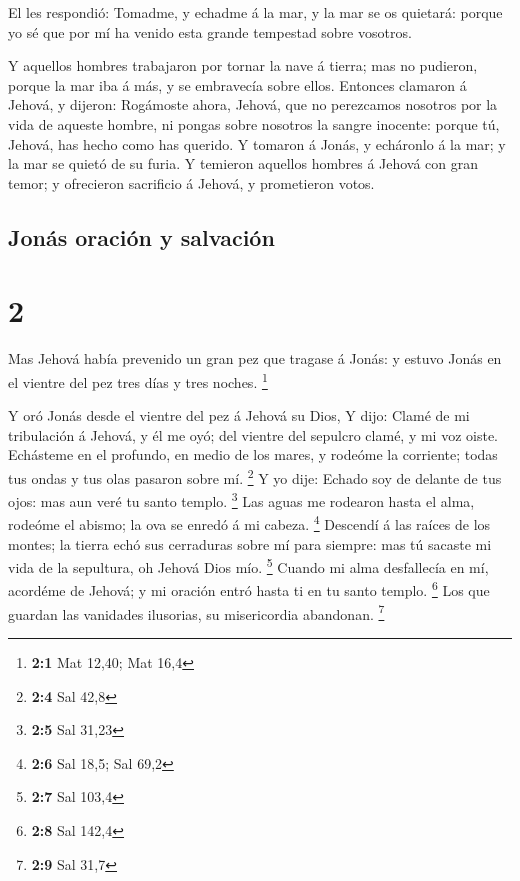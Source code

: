  El les respondió: Tomadme, y echadme á la mar, y la mar se
os quietará: porque yo sé que por mí ha venido esta grande tempestad
sobre vosotros.

 Y aquellos hombres trabajaron por tornar la nave á tierra;
mas no pudieron, porque la mar iba á más, y se embravecía sobre ellos.
 Entonces clamaron á Jehová, y dijeron: Rogámoste ahora,
Jehová, que no perezcamos nosotros por la vida de aqueste hombre, ni
pongas sobre nosotros la sangre inocente: porque tú, Jehová, has hecho
como has querido.  Y tomaron á Jonás, y echáronlo á la mar;
y la mar se quietó de su furia.  Y temieron aquellos
hombres á Jehová con gran temor; y ofrecieron sacrificio á Jehová, y
prometieron votos. 

\hypertarget{jonuxe1s-oraciuxf3n-y-salvaciuxf3n}{%
\subsection{Jonás oración y
salvación}\label{jonuxe1s-oraciuxf3n-y-salvaciuxf3n}}

\hypertarget{section-1}{%
\section{2}\label{section-1}}

 Mas Jehová había prevenido un gran pez que tragase á Jonás:
y estuvo Jonás en el vientre del pez tres días y tres noches.
\footnote{\textbf{2:1} Mat 12,40; Mat 16,4}

 Y oró Jonás desde el vientre del pez á Jehová su Dios,
 Y dijo: Clamé de mi tribulación á Jehová, y él me oyó; del
vientre del sepulcro clamé, y mi voz oiste.  Echásteme en el
profundo, en medio de los mares, y rodeóme la corriente; todas tus ondas
y tus olas pasaron sobre mí. \footnote{\textbf{2:4} Sal 42,8}
 Y yo dije: Echado soy de delante de tus ojos: mas aun veré
tu santo templo. \footnote{\textbf{2:5} Sal 31,23}  Las
aguas me rodearon hasta el alma, rodeóme el abismo; la ova se enredó á
mi cabeza. \footnote{\textbf{2:6} Sal 18,5; Sal 69,2} 
Descendí á las raíces de los montes; la tierra echó sus cerraduras sobre
mí para siempre: mas tú sacaste mi vida de la sepultura, oh Jehová Dios
mío. \footnote{\textbf{2:7} Sal 103,4}  Cuando mi alma
desfallecía en mí, acordéme de Jehová; y mi oración entró hasta ti en tu
santo templo. \footnote{\textbf{2:8} Sal 142,4}  Los que
guardan las vanidades ilusorias, su misericordia abandonan. \footnote{\textbf{2:9}
  Sal 31,7}

